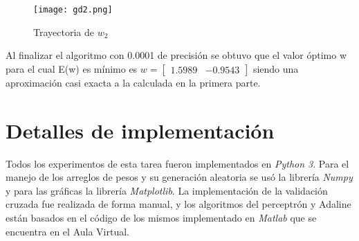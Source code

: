 \documentclass[a4paper]{article}
\begin{document}
\begin{itemize}
	\begin{figure}[H]
	\centering
	\texttt{[image: gd2.png]}
	\caption{Trayectoria de $w_{2}$}
	\label{f:gradient1_w2}
	\end{figure}
	
Al finalizar el algoritmo con 0.0001 de precisión se obtuvo que el valor óptimo w para el cual E(w) es mínimo es $w = \left[\begin{array}{cc}
1.5989 & -0.9543
\end{array}\right]$ siendo una aproximación casi exacta a la calculada en la primera parte.

\section{Detalles de implementación}
Todos los experimentos de esta tarea fueron implementados en \textit{Python 3}. Para el manejo de los arreglos de pesos y su generación aleatoria se usó la librería \textit{Numpy} y para las gráficas la librería \textit{Matplotlib}. La implementación de la validación cruzada fue realizada de forma manual, y los algoritmos del perceptrón y Adaline están basados en el código de los mismos implementado en \textit{Matlab} que se encuentra en el Aula Virtual.

\end{itemize}
\end{document}
